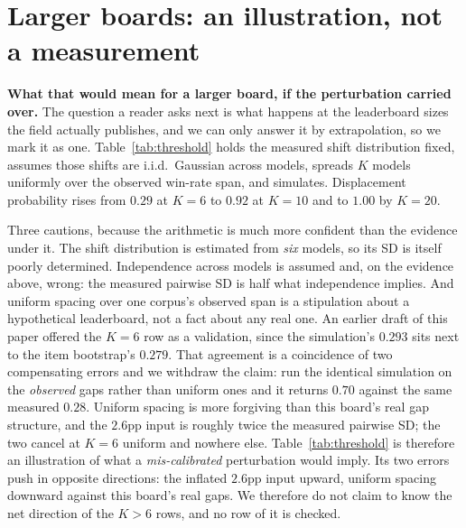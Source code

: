 \documentclass{article}
\begin{document}
\appendix
\section{Larger boards: an illustration, not a measurement}\label{app:sim}

\textbf{What that would mean for a larger board, if the perturbation carried over.} The
question a reader asks next is what happens at the leaderboard sizes the field actually
publishes, and we can only answer it by extrapolation, so we mark it as one.
Table~\ref{tab:threshold} holds the measured shift distribution fixed, assumes those
shifts are i.i.d.\ Gaussian across models, spreads $K$ models uniformly over the observed
win-rate span, and simulates. Displacement probability rises from $0.29$ at $K=6$ to
$0.92$ at $K=10$ and to $1.00$ by $K=20$.

Three cautions, because the arithmetic is much more confident than the evidence under it. The
shift distribution is estimated from \emph{six} models, so its SD is itself poorly determined.
Independence across models is assumed and, on the evidence above, wrong: the measured
pairwise SD is half what independence implies. And uniform spacing over one corpus's
observed span is a stipulation about a hypothetical leaderboard, not a fact about any real one.
An earlier draft of this paper offered the $K=6$ row as a validation, since the simulation's
$0.293$ sits next to the item bootstrap's $0.279$. That agreement is a coincidence of two
compensating errors and we withdraw the claim: run the identical simulation on the
\emph{observed} gaps rather than uniform ones and it returns $0.70$ against the same measured
$0.28$. Uniform spacing is more forgiving than this board's real gap structure, and the
$2.6$pp input is roughly twice the measured pairwise SD; the two cancel at $K=6$ uniform and
nowhere else. Table~\ref{tab:threshold} is therefore an illustration of what a
\emph{mis-calibrated} perturbation would imply. Its two errors push in opposite
directions: the inflated $2.6$pp input upward, uniform spacing downward against this board's
real gaps. We therefore do not claim to know the net direction of the $K>6$ rows, and no row
of it is checked.
\end{document}
